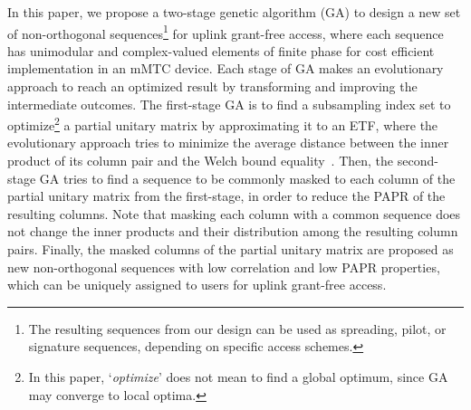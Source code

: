 \documentclass[journal]{IEEEtran}
\newcommand{\Abu}{{\bf A}}
\newcommand{\Wbu}{{\bf W}}
\numberwithin{const2}{const}
\begin{document}
In this paper, 
we propose a two-stage genetic algorithm (GA) to design a new set of non-orthogonal sequences\footnote{
The resulting sequences from our design can be used as
spreading, pilot, or signature sequences, depending on specific access schemes.} 
for uplink grant-free access, %
where each sequence has unimodular and complex-valued elements of finite phase for
cost efficient implementation in an mMTC device.
Each stage of GA makes an evolutionary approach to reach an optimized result by transforming
and improving the intermediate outcomes. 
The first-stage GA
is to find a subsampling index set to optimize\footnote{In this paper, 
`\emph{optimize}' does not mean to find a global optimum, since GA may converge to local optima.} 
a partial unitary matrix by
approximating it to an ETF,
where the evolutionary approach tries to minimize  
the average distance between the inner product of its column pair and the %
Welch bound equality~\cite{Welch:low}.
Then, the second-stage GA tries to find a sequence to be commonly masked 
to each column of the partial unitary matrix from the first-stage,
in order to reduce the PAPR of the resulting columns.
Note that masking each column with a common sequence does not change
the inner products and their distribution among the resulting column pairs.
Finally, the masked columns of the partial unitary matrix
are proposed as new non-orthogonal sequences with low correlation and low PAPR properties,
which can be uniquely assigned to users  
for uplink grant-free access.
\end{document}
